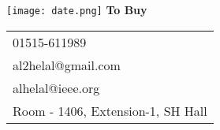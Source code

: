 \documentclass{article}
\begin{document}
\vspace*{\fill}
\begin{center}
  \texttt{[image: date.png]}
  {\Huge\textbf{To Buy}}
  \\
  \LARGE
\vspace{2cm}
  \begin{tabular}{l}
 \faPhone{} 01515-611989\\
  \faEnvelope{} al2helal@gmail.com\\
  \faEnvelope{} alhelal@ieee.org\\
  \faHome{} Room - 1406, Extension-1, SH Hall
  \end{tabular}
\end{center}
\vspace*{\fill}
 
\end{document}

